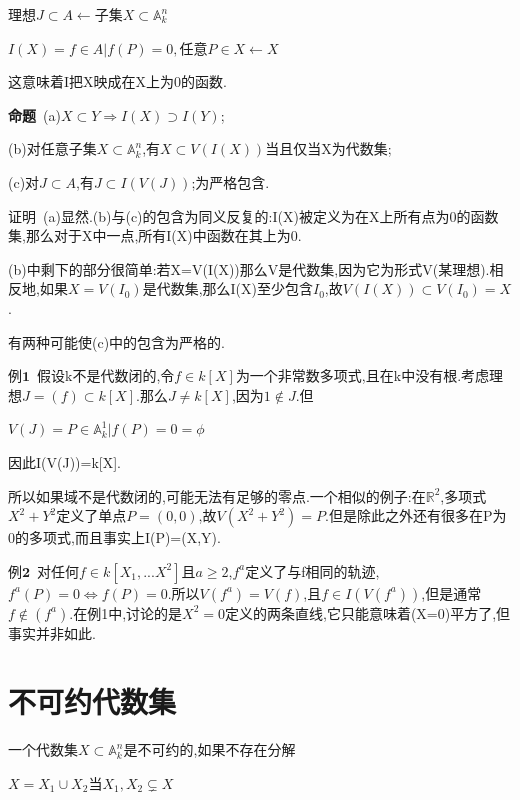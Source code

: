 \documentclass[UTF8]{book}
\begin{document}
		
		\begin{center}
			${理想J\subset A} \longleftarrow {子集X \subset \mathbb{A}^{n}_{k}}$
			
			
			$I(X)={f \in A|f(P)=0,任意P\in X} \gets X$
		\end{center}
		
		
		这意味着I把X映成在X上为0的函数.
		
		
		\textbf{命题}\ (a)$X\subset Y \Rightarrow I(X) \supset I(Y)$;
		
		
		(b)对任意子集$X \subset \mathbb{A}^{n}_{k}$,有$X \subset V(I(X))$当且仅当X为代数集;
		
		
		(c)对$J \subset A$,有$J \subset I(V(J))$;为严格包含.
		
		
		$\textbf{证明}$\ (a)显然.(b)与(c)的包含为同义反复的:I(X)被定义为在X上所有点为0的函数集,那么对于X中一点,所有I(X)中函数在其上为0.
		
		
		(b)中剩下的部分很简单:若X=V(I(X))那么V是代数集,因为它为形式V(某理想).相反地,如果$X=V(I_{0})$是代数集,那么I(X)至少包含$I_{0}$,故$V(I(X))\subset V(I_{0})=X$.
		
		
		有两种可能使(c)中的包含为严格的.
		
		
		$\textbf{例1}$\ 假设k不是代数闭的,令$f\in k[X]$为一个非常数多项式,且在k中没有根.考虑理想$J=(f)\subset k[X]$.那么$J\ne k[X]$,因为$1\notin J$.但
		
		
		\begin{center}
			$V(J)={P\in \mathbb{A}^{1}_{k}|f(P)=0=\phi}$
		\end{center}
		
		
		因此I(V(J))=k[X].
		
		
		所以如果域不是代数闭的,可能无法有足够的零点.一个相似的例子:在$\mathbb{R}^{2}$,多项式$X^{2}+Y^{2}$定义了单点$P=(0,0)$,故$V(X^{2}+Y^{2})={P}$.但是除此之外还有很多在{P}为0的多项式,而且事实上I(P)=(X,Y).
		
		
		$\textbf{例2}$\ 对任何$f\in k[X_{1},...X^{2}]$且$a\geqslant 2$,$f^{a}$定义了与f相同的轨迹,$f^{a}(P)=0\iff f(P)=0$.所以$V(f^{a})=V(f)$,且$f\in I(V(f^{a}))$,但是通常$f\notin (f^{a})$.在例1中,讨论的是$X^{2}=0$定义的两条直线,它只能意味着(X=0)平方了,但事实并非如此.
		
		
	\section{不可约代数集}
		一个代数集$X\subset \mathbb{A}^{n}_{k}$是不可约的,如果不存在分解
		
		
		\begin{center}
			$X=X_{1}\cup X_{2}当X_{1},X_{2}\varsubsetneq X$
		\end{center}
		
\end{document}
